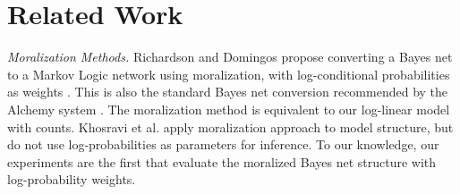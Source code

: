 \documentclass[twoside,leqno,twocolumn]{article}
\begin{document}
%
%
%

\section{Related Work} \label{sec:related} 

{\em Moralization Methods.} 
Richardson and Domingos propose converting a Bayes net to a Markov Logic network using moralization, with log-conditional probabilities as weights \cite{Domingos2007}. This is also the standard Bayes net conversion recommended by the Alchemy system \cite{bib:bayes-convert}. The moralization method is equivalent to our log-linear model with counts. Khosravi et al. \cite{Schulte2012} apply moralization approach to model structure, but do not use log-probabilities as parameters for inference. 
To our knowledge, our experiments are the first that evaluate the moralized Bayes net structure with log-probability weights. 
\end{document}
